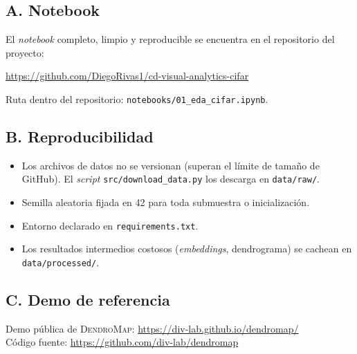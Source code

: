 \documentclass[11pt,a4paper]{article}
\begin{document}
\subsection*{A. Notebook}

El \emph{notebook} completo, limpio y reproducible se encuentra en el
repositorio del proyecto:

\begin{center}
\url{https://github.com/DiegoRivas1/cd-visual-analytics-cifar}
\end{center}

Ruta dentro del repositorio: \texttt{notebooks/01\_eda\_cifar.ipynb}.

\subsection*{B. Reproducibilidad}

\begin{itemize}[leftmargin=*]
  \item Los archivos de datos no se versionan (superan el límite de tamaño de
  GitHub). El \emph{script} \texttt{src/download\_data.py} los descarga en
  \texttt{data/raw/}.
  \item Semilla aleatoria fijada en 42 para toda submuestra o inicialización.
  \item Entorno declarado en \texttt{requirements.txt}.
  \item Los resultados intermedios costosos (\emph{embeddings}, dendrograma) se
  cachean en \texttt{data/processed/}.
\end{itemize}

\subsection*{C. Demo de referencia}

Demo pública de \textsc{DendroMap}: \url{https://div-lab.github.io/dendromap/}\\
Código fuente: \url{https://github.com/div-lab/dendromap}
\end{document}
